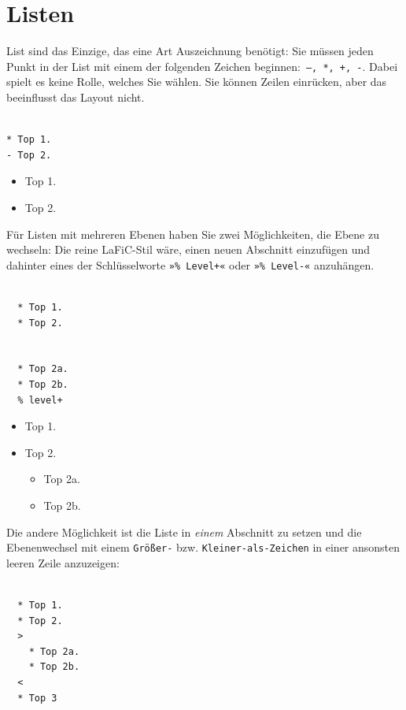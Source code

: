 \documentclass{scrartcl}
\begin{document}
\section{Listen}

{List sind das Einzige, das eine Art Auszeichnung benötigt:
Sie müssen jeden Punkt in der List mit einem der folgenden
Zeichen beginnen:~\texttt{–, *, +, -}. Dabei spielt es keine Rolle,
welches Sie wählen. Sie können Zeilen einrücken, aber das
beeinflusst das Layout nicht.\\}

\begin{verbatim}

* Top 1.
- Top 2.
\end{verbatim}


\begin{itemize}
\item Top 1.
\item Top 2.
\end{itemize}


{Für Listen mit mehreren Ebenen haben Sie zwei Möglichkeiten,
die Ebene zu wechseln: Die reine LaFiC-Stil wäre, einen
neuen Abschnitt einzufügen und dahinter eines der
Schlüsselworte \texttt{»\% Level+«} oder \texttt{»\% Level-«} anzuhängen.\\}

\begin{verbatim}

  * Top 1.
  * Top 2.


  * Top 2a.
  * Top 2b.
  % level+
\end{verbatim}


\begin{itemize}
\item Top 1.
\item Top 2.

\begin{itemize}
\item Top 2a.
\item Top 2b.
\end{itemize}

\end{itemize}


{Die andere Möglichkeit ist die Liste in \emph{einem} Abschnitt zu
setzen und die Ebenenwechsel mit einem \texttt{Größer-}
bzw. \texttt{Kleiner-als-Zeichen} in einer ansonsten leeren Zeile anzuzeigen:\\}

\begin{verbatim}

  * Top 1.
  * Top 2.
  >
    * Top 2a.
    * Top 2b.
  <
  * Top 3
\end{verbatim}
\end{document}
